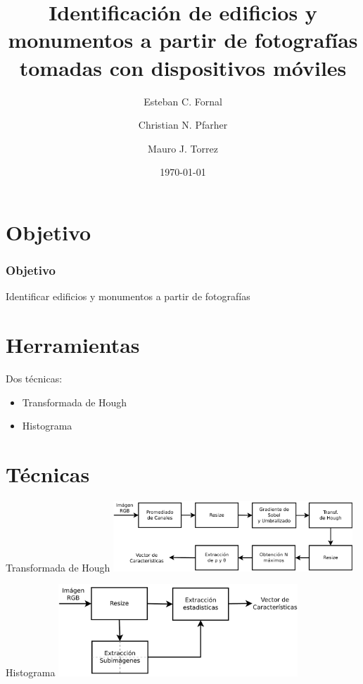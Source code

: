 \documentclass[spanish]{beamer}
\title{Identificación de edificios y monumentos a partir de fotografías tomadas 
con dispositivos móviles}
\author{Esteban C. Fornal \and Christian N. Pfarher \and Mauro J. Torrez}
\date{\today}
\begin{document}
%
\frame{\titlepage}

\section[Outline]{Objetivo}

\begin{frame}{}
\frametitle{Objetivo}
Identificar edificios y monumentos a partir de fotografías
\end{frame}

\section[Outline]{Herramientas}

\begin{frame}{Dos técnicas:}
\begin{itemize}
\item<1-> Transformada de Hough
\item<2-> Histograma
\end{itemize}
\end{frame}

\section[Outline]{Técnicas}

\begin{frame}{Transformada de Hough}
  \includegraphics[width=9cm]{../diagramas/procesohough}
\end{frame}

\begin{frame}{Histograma}
  \includegraphics[width=9cm]{../diagramas/procesoestadisticas}
\end{frame}
\end{document}
